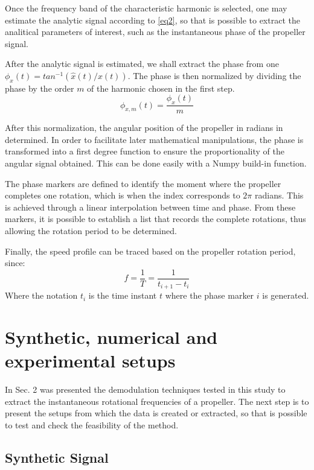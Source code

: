 \documentclass[10pt,fleqn,a4paper,twoside]{article}
\begin{document}
Once the frequency band of the characteristic harmonic is selected, one may estimate the analytic signal according to \ref{eq2}, so that is possible to extract the analitical parameters of interest, such as the instantaneous phase of the propeller signal.


After the analytic signal is estimated, we shall extract the phase from one $\phi_{x} (t) = tan^{-1}(\hat{x}(t)/x(t))$. The phase is then normalized by dividing the phase by the order $m$ of the harmonic chosen in the first step. 
\begin{equation}
    \phi_{x,m} (t)=\frac{\phi_{x}(t)}{m} 
    \label{eq3}
\end{equation}

After this normalization, the angular position of the propeller in radians in determined. In order to facilitate later mathematical manipulations, the phase is transformed into a first degree function to ensure the proportionality of the angular signal obtained. This can be done easily with a Numpy build-in function.

The phase markers are defined to identify the moment where the propeller completes one rotation, which is when the index corresponds to $2\pi$ radians. This is achieved through a linear interpolation between time and phase. From these markers, it is possible to establish a list that records the complete rotations, thus allowing the rotation period to be determined.

Finally, the speed profile can be traced based on the propeller rotation period, since:
\begin{equation}
    f = \frac{1}{T} = \frac{1}{t_{i+1}-t_{i}}
    \label{eq4}
\end{equation}
Where the notation $t_{i}$ is the time instant $t$ where the phase marker $i$ is generated. 

\section{Synthetic, numerical and experimental setups}
In Sec. 2 was presented the demodulation techniques tested in this study to extract the instantaneous rotational frequencies of a propeller. The next step is to present the setups from which the data is created or extracted, so that is possible to test and check the feasibility of the method.

\subsection{Synthetic Signal}
\end{document}
